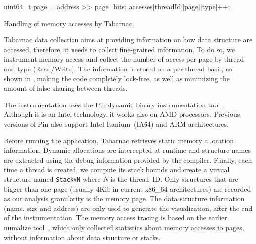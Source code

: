 
\begin{algorithm}
    \begin{algorithmic}
            \State uint64\_t page = address >> page\_bits;
            \State accesses[threadId][page][type]++;
        \EndFunction
    \end{algorithmic}
    \caption{Handling of memory accesses by Tabarnac.}
    \label{alg:tabarnac}
\end{algorithm}

\acrfull{Tabarnac} data collection aims at providing information on how data structure
are accessed, therefore, it needs to collect fine-grained information. To do so,
we instrument memory access and collect the number of access per page by thread
and type (Read/Write). The information is stored on a per-thread basis, as
shown in , making the code completely lock-free, as well
as minimizing the amount of false sharing between threads.

The instrumentation uses the Pin dynamic binary instrumentation
tool~\cite{Luk05Pin}. Although it is an Intel technology, it works also on AMD
processors.
Previous versions of Pin also support Intel Itanium~(IA64) and ARM architectures.

Before running the application, \gls{Tabarnac} retrieves static memory allocation
information. %
Dynamic allocations are intercepted at runtime and structure names
are extracted using the debug information provided by the compiler.
Finally, each time a thread is created, we compute its
stack bounds and create a virtual structure named \texttt{Stack\#N} where
$N$ is the thread~ID. Only structures that are bigger than one page (usually
$4$Kib in current x86\_64 architectures) are recorded as our
analysis granularity is the memory page. The data structure information (name,
size and address) are only used to generate the visualization, after the end
of the instrumentation.
The memory access tracing is based on the earlier numalize tool~\cite{Diener15Characterizing}, which only collected statistics about memory accesses to pages, without information about data structure or stacks.

